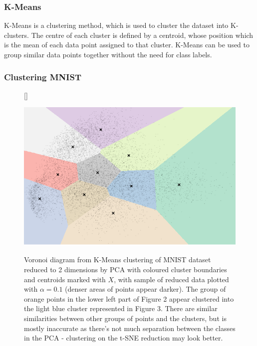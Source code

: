 \documentclass[11pt]{article}
\begin{document}
\subsubsection{K-Means}

K-Means is a clustering method, which is used to cluster the dataset into K-clusters. The centre of each cluster is defined by a centroid, whose position which is the mean of each data point assigned to that cluster. K-Means can be used to group similar data points together without the need for class labels.

\subsubsection{Clustering MNIST}

\begin{figure}[h]
[\FBwidth]
{\caption{Voronoi diagram from K-Means clustering of MNIST dataset reduced to 2 dimensions by PCA with coloured cluster boundaries and centroids marked with $X$, with sample of reduced data plotted with $\alpha=0.1$ (denser areas of points appear darker). The group of orange points in the lower left part of Figure 2 appear clustered into the light blue cluster represented in Figure 3. There are similar similarities between other groups of points and the clusters, but is mostly inaccurate as there's not much separation between the classes in the PCA - clustering on the t-SNE reduction may look better.}}
{\includegraphics[height=0.65\linewidth]{figures/01_analysing_mnist/kmeans_voronoi.png}}
\label{voroni}
\end{figure}
\end{document}
